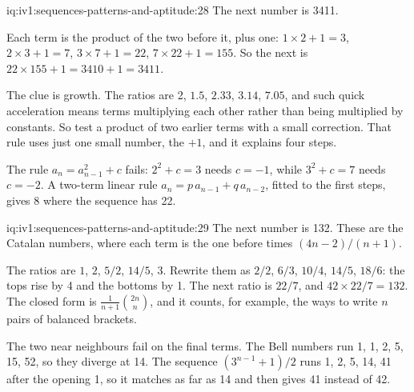 \begin{solution}{iq:iv1:sequences-patterns-and-aptitude:28}
The next number is 3411.

Each term is the product of the two before it, plus one: $1 \times 2 + 1 = 3$, $2 \times 3 + 1 = 7$, $3 \times 7 + 1 = 22$, $7 \times 22 + 1 = 155$. So the next is $22 \times 155 + 1 = 3410 + 1 = 3411$.

The clue is growth. The ratios are 2, $1.5$, $2.33$, $3.14$, $7.05$, and such quick acceleration means terms multiplying each other rather than being multiplied by constants. So test a product of two earlier terms with a small correction. That rule uses just one small number, the $+1$, and it explains four steps.

The rule $a_n = a_{n-1}^2 + c$ fails: $2^2 + c = 3$ needs $c = -1$, while $3^2 + c = 7$ needs $c = -2$. A two-term linear rule $a_n = p\,a_{n-1} + q\,a_{n-2}$, fitted to the first steps, gives 8 where the sequence has 22.

\end{solution}

\begin{solution}{iq:iv1:sequences-patterns-and-aptitude:29}
The next number is 132. These are the Catalan numbers, where each term is the one before times $(4n - 2)/(n + 1)$.

The ratios are $1$, $2$, $5/2$, $14/5$, $3$. Rewrite them as $2/2$, $6/3$, $10/4$, $14/5$, $18/6$: the tops rise by 4 and the bottoms by 1. The next ratio is $22/7$, and $42 \times 22/7 = 132$. The closed form is $\frac{1}{n + 1}\binom{2n}{n}$, and it counts, for example, the ways to write $n$ pairs of balanced brackets.

The two near neighbours fail on the final terms. The Bell numbers run 1, 1, 2, 5, 15, 52, so they diverge at 14. The sequence $(3^{n-1} + 1)/2$ runs 1, 2, 5, 14, 41 after the opening 1, so it matches as far as 14 and then gives 41 instead of 42.

\end{solution}

